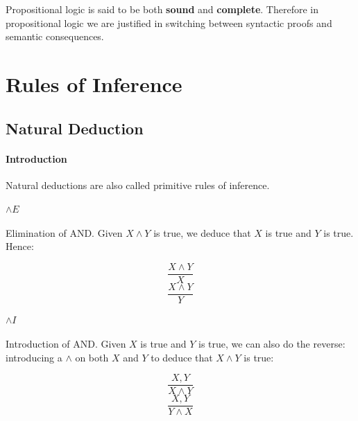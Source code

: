 \documentclass{article}
\begin{document}
\begin{multicols}{2}
  Propositional logic is said to be both {\bf sound} and {\bf complete}. Therefore in propositional logic we are justified in switching between syntactic proofs and semantic consequences.
  
  \section{Rules of Inference}
  
  \subsection{Natural Deduction}
  
  \paragraph{Introduction} Natural deductions are also called primitive rules of inference.
  
  \paragraph{$\land E$} Elimination of AND. Given $X \land Y$ is true, we deduce that $X$ is true and $Y$ is true. Hence:
  
  \begin{multicols}{2}
  \begin{equation*}  
  \frac{X \land Y}{X}
  \end{equation*}
  \break
  \begin{equation*}
  \frac{X \land Y}{Y}
  \end{equation*}
  \end{multicols}
  
  \paragraph{$\land I$} Introduction of AND. Given $X$ is true and $Y$ is true, we can also do the reverse: introducing a $\land$ on both $X$ and $Y$ to deduce that $X \land Y$ is true:
  
  \begin{multicols}{2}
  \begin{equation*}  
  \frac{X, Y}{X \land Y}
  \end{equation*}
  \break
  \begin{equation*}  
  \frac{X, Y}{Y \land X}
  \end{equation*}
  \end{multicols}
  

\end{multicols}
\end{document}
